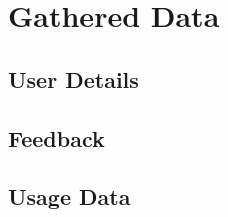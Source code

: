\newpage

\pagestyle{plain}

\printbibliography[heading=bibintoc,title={References}]

\appendix





\chapter{Gathered Data}

\section*{User Details}





\section*{Feedback}



\section*{Usage Data}



\newpage

\pagestyle{empty}

